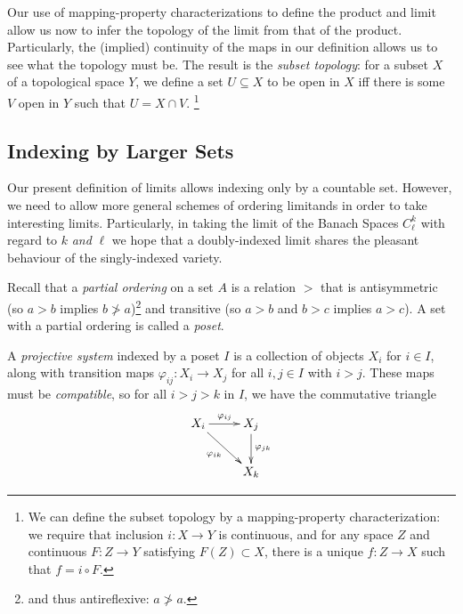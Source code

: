         Our use of mapping-property characterizations to define the product and limit allow us now to infer the topology of the limit from that of the product.
        Particularly, the (implied) continuity of the maps in our definition allows us to see what the topology must be.
        The result is the \emph{subset topology}: for a subset $X$ of a topological space $Y$, we define a set $U\subseteq X$ to be open in $X$ iff there is some $V$ open in $Y$ such that $U=X\cap V$.%
        \footnote{We can define the subset topology by a mapping-property characterization: we require that inclusion $i:X\rightarrow Y$ is continuous, and for any space $Z$ and continuous $F:Z\rightarrow Y$ satisfying $F(Z)\subset X$, there is a unique $f:Z\rightarrow X$ such that $f=i\circ F$.}

      \subsection{Indexing by Larger Sets}
        Our present definition of limits allows indexing only by a countable set.
        However, we need to allow more general schemes of ordering limitands in order to take interesting limits.
        Particularly, in taking the limit of the Banach Spaces $C^k_\ell$ with regard to $k$ \emph{and} $\ell$ we hope that a doubly-indexed limit shares the pleasant behaviour of the singly-indexed variety.
        
        Recall that a \emph{partial ordering} on a set $A$ is a relation $>$ that is antisymmetric (so $a>b$ implies $b\not>a$)\footnote{and thus antireflexive: $a\not>a$.} and transitive (so $a>b$ and $b>c$ implies $a>c$).
        A set with a partial ordering is called a \emph{poset}.

        A \emph{projective system} indexed by a poset $I$ is a collection of objects $X_i$ for $i\in I$, along with transition maps $\varphi_{ij}:X_i\rightarrow X_j$ for all $i,j\in I$ with $i>j$.
        These maps must be \emph{compatible}, so for all $i>j>k$ in $I$, we have the commutative triangle
        \begin{displaymath}
          \xymatrix{
            X_i \ar[r]^{\varphi_{ij}} \ar[dr]_{\varphi_{ik}} & X_j \ar[d]^{\varphi_{jk}} \\
            & X_k
          }
        \end{displaymath}

